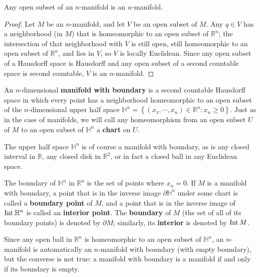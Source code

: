 \documentclass{mathnotes}
\begin{document}
\begin{lem}
    Any open subset of an $n$-manifold is an $n$-manifold.
\end{lem}

\begin{proof}
    Let $M$ be an $n$-manifold, and let $V$ be an open subset of $M$. Any $q\in V$ has a neighborhood (in $M$) that is homeomorphic to an
    open subset of $\mathbb{R}^n$; the intersection of that neighborhood with $V$ is still open, still homeomorphic to an open subset of $\mathbb{R}^n$,
    and lies in $V$, so $V$ is locally Euclidean. Since any open subset of a Hausdorff space is Hausdorff and any open subset of a second countable
    space is second countable, $V$ is an $n$-manifold.
\end{proof}

\begin{defn}
    An $n$-dimensional \textbf{manifold with boundary} is a second countable Hausdorff space in which every point has a neighborhood
    homeomorphic to an open subset of the $n$-dimensional upper half space
    $\mathbb{H}^n=\left\{ \left( x_1,\cdots,x_n \right)\in\mathbb{R}^n:x_n\geq 0\right\}$. Just as in the case of manifolds, we will
    call any homeomorphism from an open subset $U$ of $M$ to an open subset of $\mathbb{H}^n$ a \textbf{chart} on $U$.
\end{defn}

The upper half space $\mathbb{H}^n$ is of course a manifold with boundary, as is any closed interval in $\mathbb{R}$, any closed
disk in $\mathbb{R}^2$, or in fact a closed ball in any Euclidean space.

\begin{defn}
    The boundary of $\mathbb{H}^n$ in $\mathbb{R}^n$ is the set of points where $x_n=0.$ If $M$ is a manifold with boundary, a point that is
    in the inverse image $\partial\mathbb{H}^n$ under some chart is called a \textbf{boundary point} of $M$, and a point that is in the
    inverse image of $\operatorname{Int} \mathbb{H}^n$ is called an \textbf{interior point}. The \textbf{boundary} of $M$ (the set of all of its boundary
    points) is denoted by $\partial M$; similarly, its \textbf{interior} is denoted by $\operatorname{Int} M$.
\end{defn}

Since any open ball in $\mathbb{R}^n$ is homeomorphic to an open subset of $\mathbb{H}^n$, an $n$-manifold is automatically an $n$-manifold with
boundary (with empty boundary), but the converse is not true: a manifold with boundary is a manifold if and only if its boundary is empty.
\end{document}

